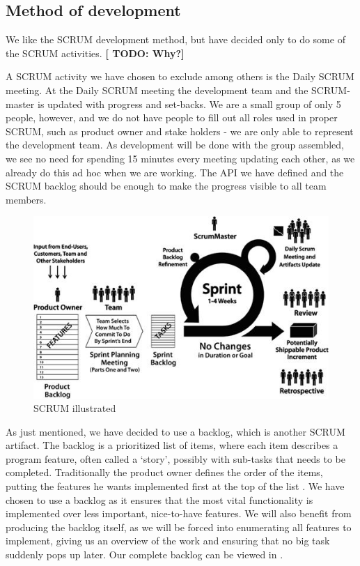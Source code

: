 \subsection{Method of development}
We like the SCRUM development method, but have decided only to do some of the SCRUM activities. \textbf{[ TODO: Why?]}

A SCRUM activity we have chosen to exclude among others is the Daily SCRUM meeting.
At the Daily SCRUM meeting the development team and the SCRUM-master is updated with progress and set-backs.
We are a small group of only 5 people, however, and we do not have people to fill out all roles used in proper SCRUM, such as product owner and stake holders - we are only able to represent the development team.
As development will be done with the group assembled, we see no need for spending 15 minutes every meeting updating each other, as we already do this ad hoc when we are working.
The API we have defined and the SCRUM backlog should be enough to make the progress visible to all team members.

\begin{figure}[H]
  \includegraphics[width=\textwidth]{illustrations/scrum.jpg}
  \caption{SCRUM illustrated}
  \label{scrum_picture}
\end{figure}

As just mentioned, we have decided to use a backlog, which is another SCRUM artifact.
The backlog is a prioritized list of items, where each item describes a program feature, often called a `story', possibly with sub-tasks that needs to be completed. Traditionally the product owner defines the order of the items, putting the features he wants implemented first at the top of the list \cite[p. 12]{scrum-org-guide}.
We have chosen to use a backlog as it ensures that the most vital functionality is implemented over less important, nice-to-have features. We will also benefit from producing the backlog itself, as we will be forced into enumerating all features to implement, giving us an overview of the work and ensuring that no big task suddenly pops up later.
Our complete backlog can be viewed in .

